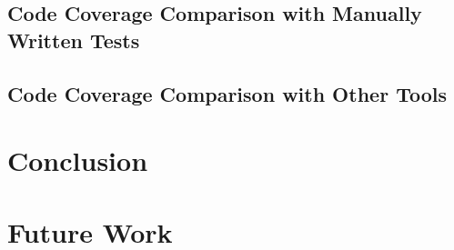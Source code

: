 \documentclass{article}
\begin{document}
\subsection{Code Coverage Comparison with Manually Written Tests}
\subsection{Code Coverage Comparison with Other Tools}


\section{Conclusion}

\section{Future Work}

\appendix











\end{document}
